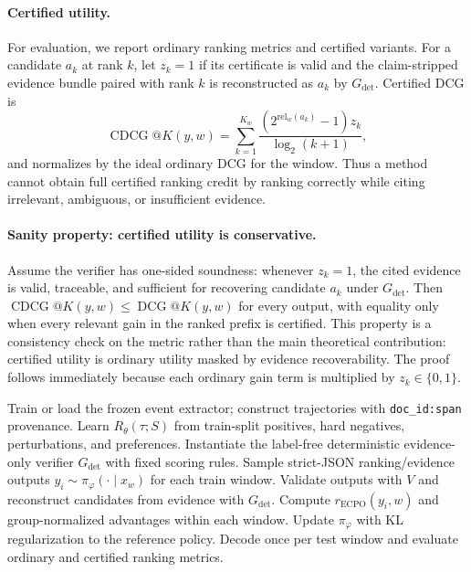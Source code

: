 \documentclass{article}
\newcommand{\Gdet}{G_{\mathrm{det}}}
\begin{document}
\paragraph{Certified utility.}
For evaluation, we report ordinary ranking metrics and certified variants. For a candidate $a_k$ at rank $k$, let $z_k=1$ if its certificate is valid and the claim-stripped evidence bundle paired with rank $k$ is reconstructed as $a_k$ by $\Gdet$. Certified DCG is
\begin{equation}
\operatorname{CDCG}@K(y,w)=
\sum_{k=1}^{K_w}\frac{(2^{\mathrm{rel}_w(a_k)}-1)z_k}{\log_2(k+1)},
\end{equation}
and \CertNDCG@K normalizes by the ideal ordinary DCG for the window. Thus a method cannot obtain full certified ranking credit by ranking correctly while citing irrelevant, ambiguous, or insufficient evidence.

\paragraph{Sanity property: certified utility is conservative.}
Assume the verifier has one-sided soundness: whenever $z_k=1$, the cited evidence is valid, traceable, and sufficient for recovering candidate $a_k$ under $\Gdet$. Then $\operatorname{CDCG}@K(y,w)\le \operatorname{DCG}@K(y,w)$ for every output, with equality only when every relevant gain in the ranked prefix is certified. This property is a consistency check on the metric rather than the main theoretical contribution: certified utility is ordinary utility masked by evidence recoverability. The proof follows immediately because each ordinary gain term is multiplied by $z_k\in\{0,1\}$.

\begin{algorithm}[t]
\caption{Evidence-Coupled Policy Optimization (ECPO)}
\label{alg:ecpo}
\begin{algorithmic}[1]
\STATE Train or load the frozen event extractor; construct trajectories with \texttt{doc\_id:span} provenance.
\STATE Learn $R_\theta(\tau;S)$ from train-split positives, hard negatives, perturbations, and preferences.
\STATE Instantiate the label-free deterministic evidence-only verifier $\Gdet$ with fixed scoring rules.
    \STATE Sample strict-JSON ranking/evidence outputs $y_i\sim\pi_\varphi(\cdot\mid x_w)$ for each train window.
    \STATE Validate outputs with $V$ and reconstruct candidates from evidence with $\Gdet$.
    \STATE Compute $r_{\mathrm{ECPO}}(y_i,w)$ and group-normalized advantages within each window.
    \STATE Update $\pi_\varphi$ with KL regularization to the reference policy.
\ENDFOR
\STATE Decode once per test window and evaluate ordinary and certified ranking metrics.
\end{algorithmic}
\end{algorithm}
\end{document}
